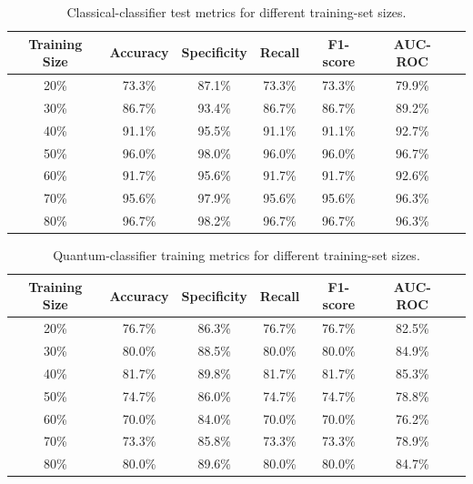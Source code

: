 \begin{table}[H]
\centering
\caption{Classical-classifier test metrics for different training-set sizes.}
\small
\begin{tabular}{|c|c|c|c|c|c|c|}
\hline
\textbf{Training Size} & \textbf{Accuracy} & \textbf{Specificity} & \textbf{Recall} & \textbf{F1-score} & \textbf{AUC-ROC} \\ \hline
20\% & 73.3\% & 87.1\% & 73.3\% & 73.3\% & 79.9\% \\ \hline
30\% & 86.7\% & 93.4\% & 86.7\% & 86.7\% & 89.2\% \\ \hline
40\% & 91.1\% & 95.5\% & 91.1\% & 91.1\% & 92.7\% \\ \hline
50\% & 96.0\% & 98.0\% & 96.0\% & 96.0\% & 96.7\% \\ \hline
60\% & 91.7\% & 95.6\% & 91.7\% & 91.7\% & 92.6\% \\ \hline
70\% & 95.6\% & 97.9\% & 95.6\% & 95.6\% & 96.3\% \\ \hline
80\% & 96.7\% & 98.2\% & 96.7\% & 96.7\% & 96.3\% \\ \hline
\end{tabular}
\end{table}

\begin{table}[H]
\centering
\caption{Quantum-classifier training metrics for different training-set sizes.}
\small
\begin{tabular}{|c|c|c|c|c|c|c|}
\hline
\textbf{Training Size} & \textbf{Accuracy} & \textbf{Specificity} & \textbf{Recall} & \textbf{F1-score} & \textbf{AUC-ROC} \\ \hline
20\% & 76.7\% & 86.3\% & 76.7\% & 76.7\% & 82.5\% \\ \hline
30\% & 80.0\% & 88.5\% & 80.0\% & 80.0\% & 84.9\% \\ \hline
40\% & 81.7\% & 89.8\% & 81.7\% & 81.7\% & 85.3\% \\ \hline
50\% & 74.7\% & 86.0\% & 74.7\% & 74.7\% & 78.8\% \\ \hline
60\% & 70.0\% & 84.0\% & 70.0\% & 70.0\% & 76.2\% \\ \hline
70\% & 73.3\% & 85.8\% & 73.3\% & 73.3\% & 78.9\% \\ \hline
80\% & 80.0\% & 89.6\% & 80.0\% & 80.0\% & 84.7\% \\ \hline
\end{tabular}
\end{table}


